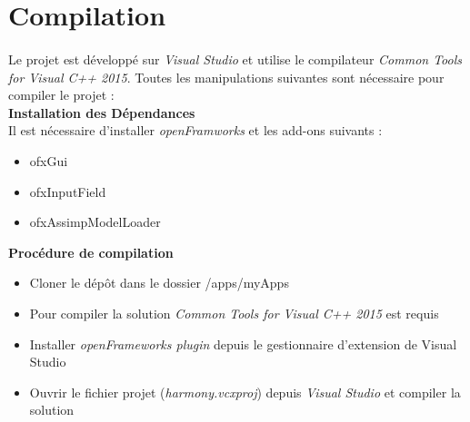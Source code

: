 \section{Compilation}
\label{s:compilation}
\paragraph{} Le projet est développé sur\textit{ Visual Studio} et utilise le compilateur \textit{Common Tools for Visual C++ 2015}. Toutes les manipulations suivantes sont nécessaire pour compiler le projet : \\
\newline 
\textbf{Installation des Dépendances} \\
Il est nécessaire d'installer \textit{openFramworks} et les add-ons suivants :
\begin{itemize}
\item ofxGui
\item ofxInputField
\item ofxAssimpModelLoader \\
\end{itemize}
\textbf{Procédure de compilation}
\begin{itemize}
\item Cloner le dépôt dans le dossier /apps/myApps
\item Pour compiler la solution \textit{Common Tools for Visual C++ 2015} est requis
\item Installer \textit{openFrameworks plugin} depuis le gestionnaire d'extension de Visual Studio 
\item Ouvrir le fichier projet (\textit{harmony.vcxproj}) depuis \textit{Visual Studio} et compiler la solution
\end{itemize}
